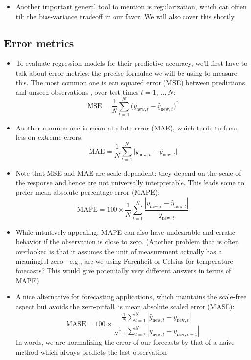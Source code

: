 \documentclass{article}
\begin{document}
\begin{itemize}
\item Another important general tool to mention is regularization, which can
  often tilt the bias-variance tradeoff in our favor. We will also cover this
  shortly 
\end{itemize}

\subsection{Error metrics}

\def\MSE{\mathrm{MSE}}
\def\MAE{\mathrm{MAE}}
\def\MAPE{\mathrm{MAPE}}
\def\MASE{\mathrm{MASE}}

\begin{itemize}
\item To evaluate regression models for their predictive accuracy, we'll first
  have to talk about error metrics: the precise formulae we will be using to 
  measure this. The most common one is ean squared error (MSE) between 
  predictions  and unseen observations
  , over test times $t = 1,\dots,N$:
  \[
  \MSE = \frac{1}{N} \sum_{t=1}^N \big( y_{\text{new},t} -
  \hat{y}_{\text{new},t} \big)^2
  \]

\item Another common one is mean absolute error (MAE), which tends to focus less
  on extreme errors: 
  \[
  \MAE = \frac{1}{N} \sum_{t=1}^N \big| y_{\text{new},t} -
  \hat{y}_{\text{new},t} \big|
  \]

\item Note that MSE and MAE are scale-dependent: they depend on the scale of the
  response and hence are not universally interpretable. This leads some to
  prefer mean absolute percentage error (MAPE):
  \[
  \MAPE = 100 \times \frac{1}{N} \sum_{t=1}^N \frac{| y_{\text{new},t} -
    \hat{y}_{\text{new},t}|}{ y_{\text{new},t} } 
  \]

\item While intuitively appealing, MAPE can also have undesirable and erratic
  behavior if the observation  is close to
  zero. (Another problem that is often overlooked is that it assumes the unit
  of measurement actually has a meaningful zero---e.g., are we using Farenheit 
  or Celsius for temperature forecasts? This would give potentially very
  different answers in terms of MAPE) 

\item A nice alternative for forecasting applications, which maintains the
  scale-free aspect but avoids the zero-pitfall, is mean absolute scaled error 
  (MASE):  
  \[
  \MASE = 100 \times \frac{\frac{1}{N} \sum_{t=1}^N | \hat{y}_{\text{new},t} -
    y_{\text{new},t} |}{\frac{1}{N-1} \sum_{t=2}^N | y_{\text{new},t} -
    y_{\text{new},t-1} |}  
  \]
  In words, we are normalizing the error of our forecasts by that of a naive
  method which always predicts the last observation


\end{itemize}
\end{document}
